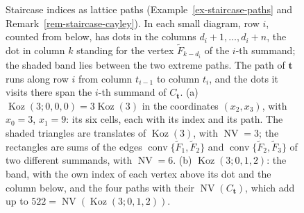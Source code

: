 \documentclass[11pt, a4paper, abstract=yes]{scrartcl}
\theoremstyle{definition}
\theoremstyle{remark}
\theoremstyle{plain}
\newcommand{\vek}[1]{\boldsymbol{#1}}
\theoremstyle{remark}
\theoremstyle{plain}
\newcommand{\Koz}{\operatorname{Koz}}
\newcommand{\conv}{\operatorname{conv}}
\newcommand{\NV}{\operatorname{NV}}
\begin{document}
\begin{figure}[htbp]
\caption{Staircase indices as lattice paths (Example~\ref{ex-staircase-paths} and
Remark~\ref{rem-staircase-cayley}). In each small
diagram, row \(i\), counted from below, has dots in the columns \(d_i+1,\dots,d_i+n\), the dot in
column \(k\) standing for the vertex \(\tilde F_{k-d_i}\) of the \(i\)-th summand; the shaded band
lies between the two extreme paths. The path of \(\vek t\) runs along row \(i\) from column
\(t_{i-1}\) to column \(t_i\), and the dots it visits there span the \(i\)-th summand of
\(C_{\vek t}\). (a) \(\Koz(3;0,0,0)=3\Koz(3)\) in the coordinates \((x_2,x_3)\), with \(x_0=3\),
\(x_1=9\): its six cells, each with its index and its path. The shaded triangles are translates of
\(\Koz(3)\), with \(\NV=3\); the rectangles are sums of the edges
\(\conv\lbrace\tilde F_1,\tilde F_2\rbrace\) and \(\conv\lbrace\tilde F_2,\tilde F_3\rbrace\) of two
different summands, with \(\NV=6\). (b) \(\Koz(3;0,1,2)\): the band, with the own index of each
vertex above its dot and the column below, and the four paths with their \(\NV(C_{\vek t})\), which
add up to \(522=\NV(\Koz(3;0,1,2))\).}
\label{fig:staircase-paths}
\end{figure}
\end{document}
